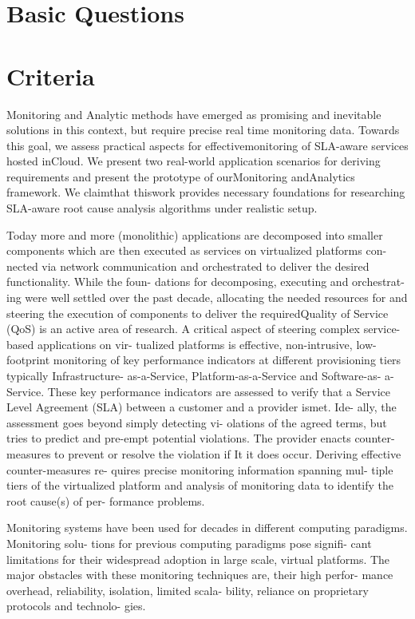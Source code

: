 \documentclass{llncs}
\begin{document}
%

\section{Basic Questions}

\section{Criteria}

Monitoring and Analytic methods have emerged as promising and inevitable solutions in this context, but require precise real time monitoring data. Towards this goal, we assess practical aspects for effectivemonitoring of SLA-aware services hosted inCloud. We present two real-world application scenarios for deriving requirements and present the prototype of ourMonitoring andAnalytics framework. We claimthat thiswork provides necessary foundations for researching SLA-aware root cause analysis algorithms under realistic setup.

Today more and more (monolithic) applications are decomposed into smaller components which are then executed as services on virtualized platforms con- nected via network communication and orchestrated to deliver the desired functionality. While the foun- dations for decomposing, executing and orchestrat- ing were well settled over the past decade, allocating the needed resources for and steering the execution of components to deliver the requiredQuality of Service (QoS) is an active area of research. A critical aspect of steering complex service-based applications on vir- tualized platforms is effective, non-intrusive, low- footprint monitoring of key performance indicators at different provisioning tiers typically Infrastructure- as-a-Service, Platform-as-a-Service and Software-as- a-Service. These key performance indicators are assessed to verify that a Service Level Agreement (SLA) between a customer and a provider ismet. Ide- ally, the assessment goes beyond simply detecting vi- olations of the agreed terms, but tries to predict and pre-empt potential violations. The provider enacts counter-measures to prevent or resolve the violation if
It it does occur. Deriving effective counter-measures re- quires precise monitoring information spanning mul- tiple tiers of the virtualized platform and analysis of monitoring data to identify the root cause(s) of per- formance problems.

Monitoring systems have been used for decades
in different computing paradigms. Monitoring solu- tions for previous computing paradigms pose signifi- cant limitations for their widespread adoption in large scale, virtual platforms. The major obstacles with these monitoring techniques are, their high perfor- mance overhead, reliability, isolation, limited scala- bility, reliance on proprietary protocols and technolo- gies.
\end{document}
